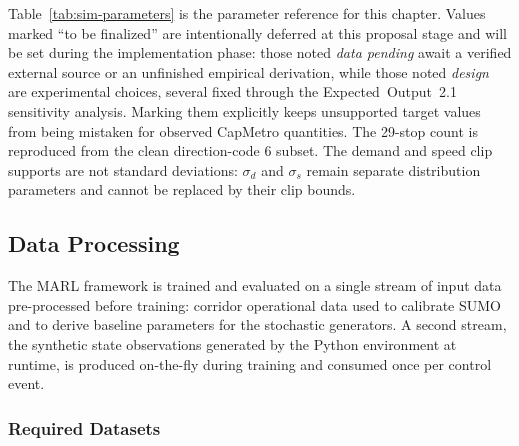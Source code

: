 \begin{table}[htbp]
\begin{tabularx}{\textwidth}{
>{\RaggedRight\arraybackslash}p{}
>{\RaggedRight\arraybackslash}p{}
X
>{\RaggedRight\arraybackslash}p{}
}
\bottomrule
\end{tabularx}
\end{table}

Table~\ref{tab:sim-parameters} is the parameter reference for this chapter. Values marked ``to be finalized'' are intentionally deferred at this proposal stage and will be set during the implementation phase: those noted \emph{data pending} await a verified external source or an unfinished empirical derivation, while those noted \emph{design} are experimental choices, several fixed through the Expected~Output~2.1 sensitivity analysis. Marking them explicitly keeps unsupported target values from being mistaken for observed CapMetro quantities. The 29-stop count is reproduced from the clean direction-code 6 subset. The demand and speed clip supports are not standard deviations: $\sigma_d$ and $\sigma_s$ remain separate distribution parameters and cannot be replaced by their clip bounds.

\subsection{Data Processing}

The MARL framework is trained and evaluated on a single stream of input data pre-processed before training: corridor operational data used to calibrate SUMO and to derive baseline parameters for the stochastic generators. A second stream, the synthetic state observations generated by the Python environment at runtime, is produced on-the-fly during training and consumed once per control event.

\subsubsection{Required Datasets}

